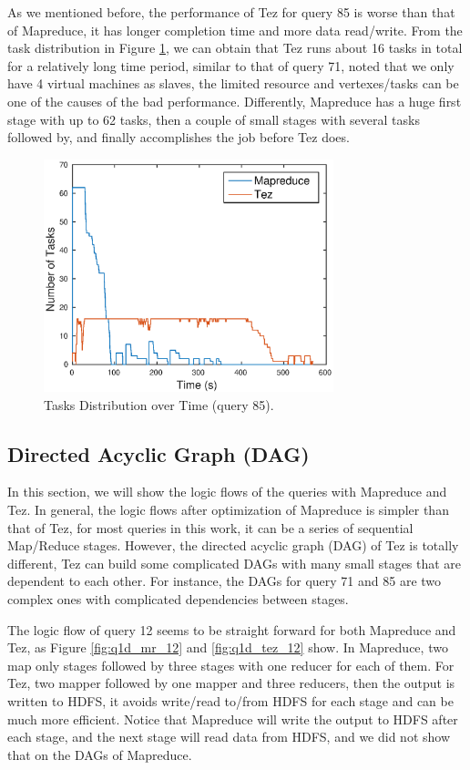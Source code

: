 \documentclass[10pt]{article}
\begin{document}
As we mentioned before, the performance of Tez for query 85 is worse than that of Mapreduce, it has longer completion time and more data read/write. From the task distribution in Figure \ref{fig:q1c_tasks_85}, we can obtain that Tez runs about 16 tasks in total for a relatively long time period, similar to that of query 71, noted that we only have 4 virtual machines as slaves, the limited resource and vertexes/tasks can be one of the causes of the bad performance. Differently, Mapreduce has a huge first stage with up to 62 tasks, then a couple of small stages with several tasks followed by, and finally accomplishes the job before Tez does.
\begin{figure}
\begin{center}
\includegraphics[width=0.75\textwidth]{pic/q1c_task_distribution_85}
\caption{Tasks Distribution over Time (query 85).}
\label{fig:q1c_tasks_85}
\end{center}
\end{figure}


\subsection{Directed Acyclic Graph (DAG)}
In this section, we will show the logic flows of the queries with Mapreduce and Tez. In general, the logic flows after optimization of Mapreduce is simpler than that of Tez, for most queries in this work, it can be a series of sequential Map/Reduce stages. However, the directed acyclic graph (DAG) of Tez is totally different, Tez can build some complicated DAGs with many small stages that are dependent to each other. For instance, the DAGs for query 71 and 85 are two complex ones with complicated dependencies between stages. 

The logic flow of query 12 seems to be straight forward for both Mapreduce and Tez, as Figure \ref{fig:q1d_mr_12} and \ref{fig:q1d_tez_12} show. In Mapreduce, two map only stages followed by three stages with one reducer for each of them. For Tez, two mapper followed by one mapper and three reducers, then the output is written to HDFS, it avoids write/read to/from HDFS for each stage and can be much more efficient. Notice that Mapreduce will write the output to HDFS after each stage, and the next stage will read data from HDFS, and we did not show that on the DAGs of Mapreduce.
\end{document}
